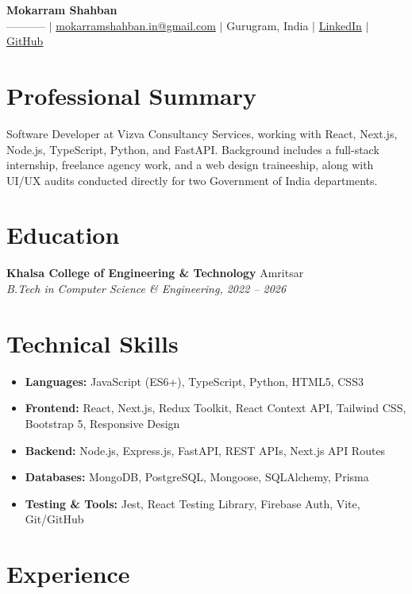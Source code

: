 \documentclass[10.5pt,a4paper]{article}
\newcommand{\jobheader}[3]{%
  \noindent\textbf{#1} \hfill #2 \\
  \textit{#3}
}
\begin{document}
\begin{center}
    {\LARGE \textbf{Mokarram Shahban}}\\[4pt]
    ----------- \; $|$ \; \href{mailto:mokarramshahban.in@gmail.com}{mokarramshahban.in@gmail.com} \; $|$ \; Gurugram, India \; $|$ \; \href{https://linkedin.com}{LinkedIn} \; $|$ \; \href{https://github.com}{GitHub}
\end{center}

\section*{Professional Summary}
Software Developer at Vizva Consultancy Services, working with React, Next.js, Node.js, TypeScript, Python, and FastAPI. Background includes a full-stack internship, freelance agency work, and a web design traineeship, along with UI/UX audits conducted directly for two Government of India departments.

\section*{Education}
\jobheader{Khalsa College of Engineering \& Technology}{Amritsar}{B.Tech in Computer Science \& Engineering, 2022 -- 2026}

\section*{Technical Skills}
\begin{itemize}
    \item \textbf{Languages:} JavaScript (ES6+), TypeScript, Python, HTML5, CSS3
    \item \textbf{Frontend:} React, Next.js, Redux Toolkit, React Context API, Tailwind CSS, Bootstrap 5, Responsive Design
    \item \textbf{Backend:} Node.js, Express.js, FastAPI, REST APIs, Next.js API Routes
    \item \textbf{Databases:} MongoDB, PostgreSQL, Mongoose, SQLAlchemy, Prisma
    \item \textbf{Testing \& Tools:} Jest, React Testing Library, Firebase Auth, Vite, Git/GitHub
\end{itemize}

\section*{Experience}
\end{document}
